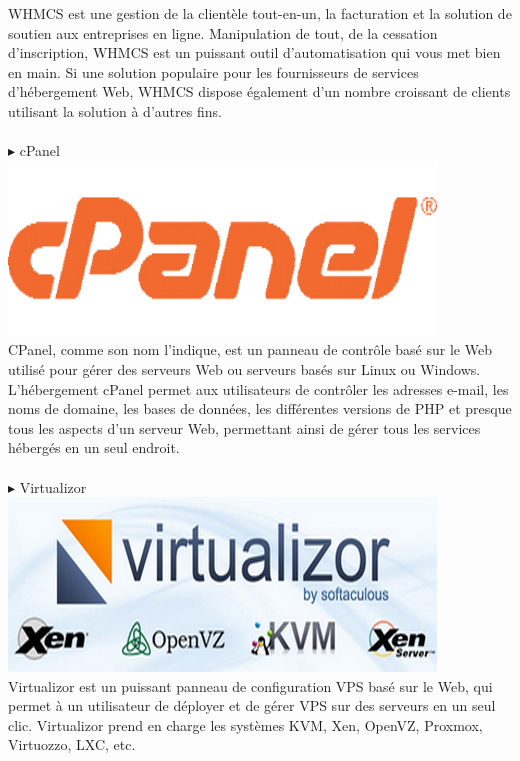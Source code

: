 \documentclass[a4paper, 12pt]{report}
\begin{document}
WHMCS est une gestion de la clientèle tout-en-un, la facturation et la solution de soutien aux entreprises en ligne. Manipulation de tout, de la cessation d'inscription, WHMCS est un puissant outil d'automatisation qui vous met bien en main. Si une solution populaire pour les fournisseurs de services d'hébergement Web, WHMCS dispose également d'un nombre croissant de clients utilisant la solution à d'autres fins.
\\
\\
\noindent $\blacktriangleright$ cPanel
\\
\includegraphics{img/outils/9}
\\
\noindent CPanel, comme son nom l’indique, est un panneau de contrôle basé sur le Web utilisé pour gérer des serveurs Web ou serveurs basés sur Linux ou Windows. L’hébergement cPanel permet aux utilisateurs de contrôler les adresses e-mail, les noms de domaine, les bases de données, les différentes versions de PHP et presque tous les aspects d’un serveur Web, permettant ainsi de gérer tous les services hébergés en un seul endroit.\\
\\
\noindent $\blacktriangleright$ Virtualizor
\\
\includegraphics{img/outils/10}
\\
\noindent Virtualizor est un puissant panneau de configuration VPS basé sur le Web, qui permet à un utilisateur de déployer et de gérer VPS sur des serveurs en un seul clic. Virtualizor prend en charge les systèmes KVM, Xen, OpenVZ, Proxmox, Virtuozzo, LXC, etc. 
\end{document}
